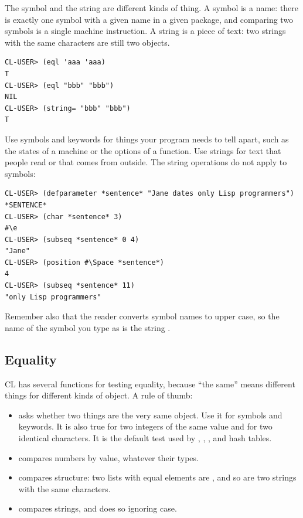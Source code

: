The symbol  and the string  are different kinds
of thing. A symbol is a name: there is exactly one symbol with a
given name in a given package, and comparing two symbols is a single
machine instruction. A string is a piece of text: two strings with
the same characters are still two objects.

\begin{verbatim}
CL-USER> (eql 'aaa 'aaa)
T
CL-USER> (eql "bbb" "bbb")
NIL
CL-USER> (string= "bbb" "bbb")
T
\end{verbatim}

Use symbols and keywords for things your program needs to tell apart,
such as the states of a machine or the options of a function. Use
strings for text that people read or that comes from outside. The
string operations do not apply to symbols:

\begin{verbatim}
CL-USER> (defparameter *sentence* "Jane dates only Lisp programmers")
*SENTENCE*
CL-USER> (char *sentence* 3)
#\e
CL-USER> (subseq *sentence* 0 4)
"Jane"
CL-USER> (position #\Space *sentence*)
4
CL-USER> (subseq *sentence* 11)
"only Lisp programmers"
\end{verbatim}

Remember also that the reader converts symbol names to upper case, so
the name of the symbol you type as  is the string
.

\subsection{Equality}
\label{sec:equality}

CL has several functions for testing equality, because ``the same''
means different things for different kinds of object. A rule of
thumb:

\begin{itemize}
\item {} asks whether two things are the very same object.
Use it for symbols and keywords. It is also true for two integers of
the same value and for two identical characters. It is the default
test used by , , , 
and hash tables.

\item \code{=} compares numbers by value, whatever their types.

\item {} compares structure: two lists with equal elements
are , and so are two strings with the same characters.

\item {} compares strings, and  does so
ignoring case.
\end{itemize}

